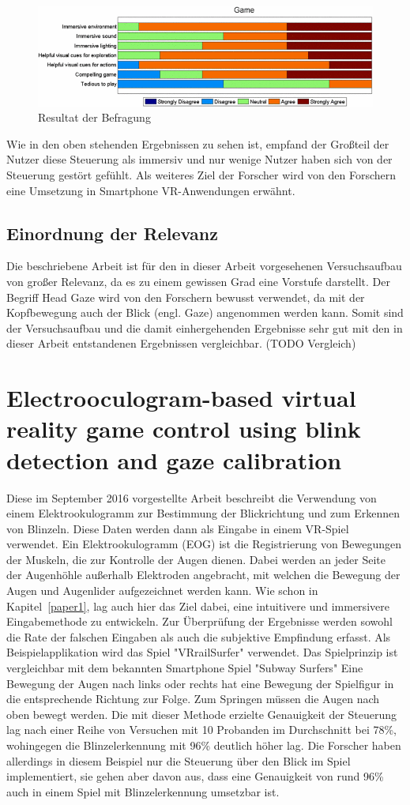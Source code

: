 \begin{figure}
	\includegraphics[width=\linewidth]{images/study1immersion}
	\caption{Resultat der Befragung}
	\label{fig:result1}
\end{figure}

Wie in den oben stehenden Ergebnissen zu sehen ist, empfand der Großteil der Nutzer diese Steuerung als immersiv und nur wenige Nutzer haben sich von der Steuerung gestört gefühlt. Als weiteres Ziel der Forscher wird von den Forschern eine Umsetzung in Smartphone VR-Anwendungen erwähnt.
\subsection{Einordnung der Relevanz}
Die beschriebene Arbeit ist für den in dieser Arbeit vorgesehenen Versuchsaufbau von großer Relevanz, da es zu einem gewissen Grad eine Vorstufe darstellt. Der Begriff Head Gaze wird von den Forschern bewusst verwendet, da mit der Kopfbewegung auch der Blick (engl. Gaze) angenommen werden kann. Somit sind der Versuchsaufbau und die damit einhergehenden Ergebnisse sehr gut mit den in dieser Arbeit entstandenen Ergebnissen vergleichbar. (TODO Vergleich) 
\section{Electrooculogram-based virtual reality game control using blink detection and gaze calibration}
Diese im September 2016 vorgestellte Arbeit beschreibt die Verwendung von einem Elektrookulogramm zur Bestimmung der Blickrichtung und zum Erkennen von Blinzeln. Diese Daten werden dann als Eingabe in einem VR-Spiel verwendet. 
Ein Elektrookulogramm (EOG) ist die Registrierung von Bewegungen der Muskeln, die zur Kontrolle der Augen dienen. Dabei werden an jeder Seite der Augenhöhle außerhalb Elektroden angebracht, mit welchen die Bewegung der Augen und Augenlider aufgezeichnet werden kann. 
Wie schon in Kapitel~\ref{paper1}, lag auch hier das Ziel dabei, eine intuitivere und immersivere Eingabemethode zu entwickeln. Zur Überprüfung der Ergebnisse werden sowohl die Rate der falschen Eingaben als auch die subjektive Empfindung erfasst. Als Beispielapplikation wird das Spiel "VRrailSurfer" verwendet. Das Spielprinzip ist vergleichbar mit dem bekannten Smartphone Spiel "Subway Surfers" Eine Bewegung der Augen nach links oder rechts hat eine Bewegung der Spielfigur in die entsprechende Richtung zur Folge. Zum Springen müssen die Augen nach oben bewegt werden. Die mit dieser Methode erzielte Genauigkeit der Steuerung lag nach einer Reihe von Versuchen mit 10 Probanden im Durchschnitt bei 78\%, wohingegen die Blinzelerkennung mit 96\% deutlich höher lag. Die Forscher haben allerdings in diesem Beispiel nur die Steuerung über den Blick im Spiel implementiert, sie gehen aber davon aus, dass eine Genauigkeit von rund 96\% auch in einem Spiel mit Blinzelerkennung umsetzbar ist. 
